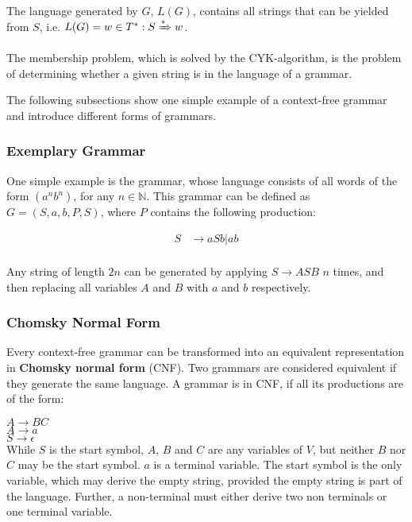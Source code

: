 The language generated by $G$, $L(G)$, contains all strings that can be yielded from $S$, i.e. $L(G)={w\in T^*: S\xRightarrow{*}w}$.

The membership problem, which is solved by the CYK-algorithm, is the problem of determining whether a given string is in the language of a grammar.

The following subsections show one simple example of a context-free grammar and introduce different forms of grammars.

\subsubsection{Exemplary Grammar}
\label{subsec:exemplary_grammar}


One simple example is the grammar, whose language consists of all words of the form $(a^n b^n)$, for any $n\in \mathbb{N}$.
This grammar can be defined as $G = ({S}, {a, b}, P, S)$, where $P$ contains the following production: 

\begin{align*}
S&\rightarrow aSb | ab \\
\end{align*}

Any string of length $2n$ can be generated by applying $S\rightarrow ASB$ $n$ times, and then replacing all variables $A$ and $B$ with $a$ and $b$ respectively.


\subsubsection{Chomsky Normal Form}

Every context-free grammar can be transformed into an equivalent representation in \textbf{Chomsky normal form} (CNF).
Two grammars are considered equivalent if they generate the same language.
A grammar is in CNF, if all its productions are of the form:

\hspace*{0.5cm}$A\rightarrow BC$\\
\hspace*{1cm}$A\rightarrow a$\\
\hspace*{1cm}$S\rightarrow \epsilon$\\

While $S$ is the start symbol, $A$, $B$ and $C$ are any variables of $V$, but neither $B$ nor $C$ may be the start symbol.
$a$ is a terminal variable.
The start symbol is the only variable, which may derive the empty string, provided the empty string is part of the language.
Further, a non-terminal must either derive two non terminals or one terminal variable.

